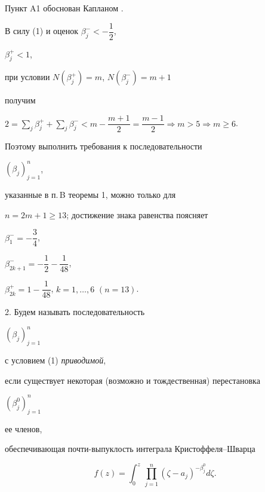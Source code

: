 \begin{note}


Пункт A1 обоснован Капланом \cite{Kap}.


\end{note}





\begin{note} В силу (1) и оценок $\beta_j^- < -\dfrac{1}{2}$,


$\beta _{j}^{+} <1$,


при условии $N(\beta _{j}^{+} )=m$, $N(\beta _{j}^{-} )=m+1$


получим


$2=\sum\limits_{j}\beta_j^+ +\sum\limits_{j}\beta_j^-


< m-\dfrac{m+1}{2}


= \dfrac{m-1}{2}\Rightarrow m>5 \Rightarrow m\ge 6$.


Поэтому выполнить требования к последовательности


$(\beta _{j})_{j=1}^{n}$,


указанные в п.\,B теоремы 1, можно только для


$n=2m+1\ge 13$; достижение знака равенства поясняет


\end{note}





\begin{exam} 


$\beta_1^-=-\dfrac{3}{4}$,


$\beta_{2k+1}^-=-\dfrac{1}{2}-\dfrac{1}{48}$,


$\beta_{2k}^+=1-\dfrac{1}{48}$, $k=1,\dotsc,6$ $(n=13)$.


\end{exam}





2. Будем называть последовательность


$(\beta _{j})_{j=1}^{n}$


с условием (1) {\em приводимой},


если существует некоторая (возможно и тождественная) перестановка


$(\beta _{j}^{0})_{j=1}^{n}$


ее членов,


обеспечивающая почти-выпуклость интеграла Крис\-тоф\-фе\-ля--Швар\-ца


\begin{equation}


f(z)=\int_{0}^{z}\,


\prod_{j=1}^{n}(\zeta-a_{j})^{-\beta _{j}^{0}}d\zeta.


\end{equation}


